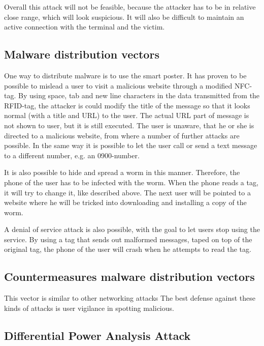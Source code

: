 Overall this attack will not be feasible, because the attacker has to be in relative close range, which will look suspicious. It will also be difficult to maintain an active connection with the terminal and the victim.




\subsection{Malware distribution vectors}
One way to distribute malware is to use the smart poster.
It has proven to be possible to mislead a user to visit a malicious website through a modified NFC-tag.
By using space, tab and new line characters in the data transmitted from the RFID-tag, the attacker is could modify the title of the message so that it looks normal (with a title and URL) to the user.
The actual URL part of message is not shown to user, but it is still executed.
The user is unaware, that he or she is directed to a malicious website, from where a number of further attacks are possible.
In the same way it is possible to let the user call or send a text message to a different number, e.g. an 0900-number.

It is also possible to hide and spread a worm in this manner.
Therefore, the phone of the user has to be infected with the worm. When the phone reads a tag, it will try to change it, like described above.
The next user will be pointed to a website where he will be tricked into downloading and installing a copy of the worm.

A denial of service attack is also possible, with the goal to let users stop using the service. By using a tag that sends out malformed messages, taped on top of the original tag, the phone of the user will crash when he attempts to read the tag. \cite{mulliner2009vulnerability,rieback2006your} 

\subsection{Countermeasures malware distribution vectors}
This vector is similar to other networking attacks
The best defense against these kinds of attacks is user vigilance in spotting malicious. 

\subsection{Differential Power Analysis Attack}

